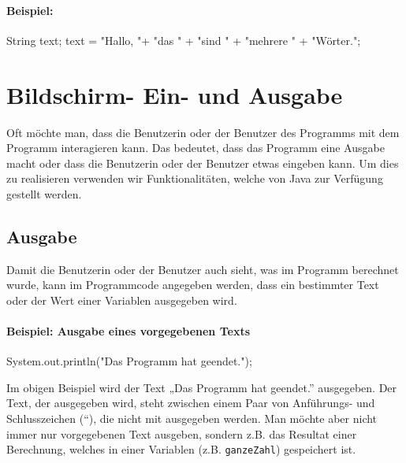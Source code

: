 \documentclass[10pt,paper=17cm:22cm, twoside=true, DIV=14]{scrbook}
\newenvironment {Shaded}
        {\begin{mdframed}[style=code] }
         {\end{mdframed}}
\newcommand{\StringTok}[1]{\textcolor[rgb]{0.4,0.4,0.4}{{#1}}}
\newcommand{\FunctionTok}[1]{\textcolor[rgb]{0.2,0.2,0.2}{#1}}
\newcommand{\NormalTok}[1]{#1}
\begin{document}
\paragraph{Beispiel:}\label{beispiel-8}

\begin{Shaded}
\begin{Highlighting}[]
\NormalTok{String text;}
\NormalTok{text = }\StringTok{"Hallo, "}\NormalTok{+ }\StringTok{"das "} \NormalTok{+ }\StringTok{"sind "} \NormalTok{+ }\StringTok{"mehrere "} \NormalTok{+ }\StringTok{"Wörter."}\NormalTok{;}
\end{Highlighting}
\end{Shaded}

\section{Bildschirm- Ein- und
Ausgabe}\label{bildschirm--ein--und-ausgabe}

Oft möchte man, dass die Benutzerin oder der Benutzer des Programms mit
dem Programm interagieren kann. Das bedeutet, dass das Programm eine
Ausgabe macht oder dass die Benutzerin oder der Benutzer etwas eingeben
kann. Um dies zu realisieren verwenden wir Funktionalitäten, welche von
Java zur Verfügung gestellt werden.

\subsection{Ausgabe}\label{ausgabe}

Damit die Benutzerin oder der Benutzer auch sieht, was im Programm
berechnet wurde, kann im Programmcode angegeben werden, dass ein
bestimmter Text oder der Wert einer Variablen ausgegeben wird.

\paragraph{Beispiel: Ausgabe eines vorgegebenen
Texts}\label{beispiel-ausgabe-eines-vorgegebenen-texts}

\begin{Shaded}
\begin{Highlighting}[]
\NormalTok{System.}\FunctionTok{out}\NormalTok{.}\FunctionTok{println}\NormalTok{(}\StringTok{"Das Programm hat geendet."}\NormalTok{);}
\end{Highlighting}
\end{Shaded}

Im obigen Beispiel wird der Text „Das Programm hat geendet.''
ausgegeben. Der Text, der ausgegeben wird, steht zwischen einem Paar von
Anführungs- und Schlusszeichen (``), die nicht mit ausgegeben werden.
Man möchte aber nicht immer nur vorgegebenen Text ausgeben, sondern z.B.
das Resultat einer Berechnung, welches in einer Variablen (z.B.
\texttt{ganzeZahl}) gespeichert ist.
\end{document}
